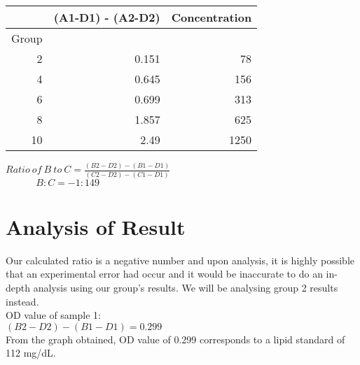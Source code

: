 \documentclass[11.5pt,a4paper]{IEEEtran}
\begin{document}
    \begin{table}[H]
    	\centering
    	\label{my-label}
    	\begin{tabular}{|r|r|r|}
    		\hline
    		\multicolumn{1}{|l|}{}      & \multicolumn{1}{l|}{(A1-D1) - (A2-D2)} & \multicolumn{1}{l|}{Concentration} \\ \hline
    		\multicolumn{1}{|c|}{Group} &                                        &                                    \\ \hline
    		2                           & 0.151                                  & 78                                 \\ \hline
    		4                           & 0.645                                  & 156                                \\ \hline
    		6                           & 0.699                                  & 313                                \\ \hline
    		8                           & 1.857                                  & 625                                \\ \hline
    		10                          & 2.49                                   & 1250                               \\ \hline
    	\end{tabular}
    \end{table}
    $Ratio \ of \ B \ to \ C = \frac{(B2-D2)-(B1-D1)}{(C2-D2)-(C1-D1)}$ \\
    
    $\ \ \ \ \ \ \ \ \ \ \ \ \ \ B : C = -1 : 149$                       
    \section{Analysis of Result}
    Our calculated ratio is a negative number and upon analysis, it is highly possible that an experimental error had occur and it would be inaccurate to do an in-depth analysis using our group's results. We will be analysing group 2 results instead. \\
    
    OD value of sample 1: \\
    
    $(B2-D2)-(B1-D1) = 0.299$ \\
    
    From the graph obtained, OD value of 0.299 corresponds to a lipid standard of 112 mg/dL. \\
    
\end{document}
